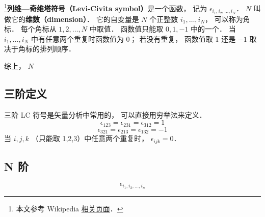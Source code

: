
\footnote{本文参考 Wikipedia \href{https://en.wikipedia.org/wiki/Levi-Civita_symbol}{相关页面}．}\textbf{列维—奇维塔符号（Levi-Civita symbol）}是一个函数， 记为 $\epsilon_{i_1, i_2, \dots, i_N}$． $N$ 叫做它的\textbf{维数（dimension）}． 它的自变量是 $N$ 个正整数 $i_1, \dots, i_N$， 可以称为角标． 每个角标从 $1, 2, \dots, N$ 中取值． 函数值只能取 $0, 1, -1$ 中的一个． 当 $i_1, \dots, i_N$ 中有任意两个重复时函数值为 0； 若没有重复， 函数值取 $1$ 还是 $-1$ 取决于角标的排列顺序．

综上， $N$ 

\subsection{三阶定义}
三阶 LC 符号是矢量分析中常用的， 可以直接用穷举法来定义．
\begin{equation}
\epsilon_{123} = \epsilon_{231} = \epsilon_{312} = 1
\end{equation}
\begin{equation}
\epsilon_{321} = \epsilon_{213} = \epsilon_{132} = -1
\end{equation}
当 $i,j,k$ （只能取 1,2,3）中任意两个重复时， $\epsilon_{ijk} = 0$．

\subsection{N 阶}
\begin{equation}
\epsilon_{i_1,i_2,\dots, i_n}
\end{equation}
